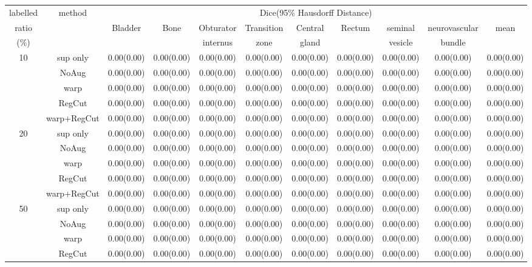 \begin{table}%
\begin{tabular}{c|c|ccccccccc}%
\hline%
labelled&\multirow{3}{*}{method}&\multicolumn{9}{c}{Dice(95\% Hausdorff Distance)}\\%
ratio&&\multirow{2}{*}{Bladder}&\multirow{2}{*}{Bone}&Obturator&Transition&Central&\multirow{2}{*}{Rectum}&seminal&neurovascular&\multirow{2}{*}{mean}\\%
(\%)&&&&internus&zone&gland&&vesicle&bundle&\\%
\hline%
\multirow{5}{*}{10}&sup only&0.00(0.00)&0.00(0.00)&0.00(0.00)&0.00(0.00)&0.00(0.00)&0.00(0.00)&0.00(0.00)&0.00(0.00)&0.00(0.00)\\%
&NoAug&0.00(0.00)&0.00(0.00)&0.00(0.00)&0.00(0.00)&0.00(0.00)&0.00(0.00)&0.00(0.00)&0.00(0.00)&0.00(0.00)\\%
&warp&0.00(0.00)&0.00(0.00)&0.00(0.00)&0.00(0.00)&0.00(0.00)&0.00(0.00)&0.00(0.00)&0.00(0.00)&0.00(0.00)\\%
&RegCut&0.00(0.00)&0.00(0.00)&0.00(0.00)&0.00(0.00)&0.00(0.00)&0.00(0.00)&0.00(0.00)&0.00(0.00)&0.00(0.00)\\%
&warp+RegCut&0.00(0.00)&0.00(0.00)&0.00(0.00)&0.00(0.00)&0.00(0.00)&0.00(0.00)&0.00(0.00)&0.00(0.00)&0.00(0.00)\\%
\hline%
\multirow{5}{*}{20}&sup only&0.00(0.00)&0.00(0.00)&0.00(0.00)&0.00(0.00)&0.00(0.00)&0.00(0.00)&0.00(0.00)&0.00(0.00)&0.00(0.00)\\%
&NoAug&0.00(0.00)&0.00(0.00)&0.00(0.00)&0.00(0.00)&0.00(0.00)&0.00(0.00)&0.00(0.00)&0.00(0.00)&0.00(0.00)\\%
&warp&0.00(0.00)&0.00(0.00)&0.00(0.00)&0.00(0.00)&0.00(0.00)&0.00(0.00)&0.00(0.00)&0.00(0.00)&0.00(0.00)\\%
&RegCut&0.00(0.00)&0.00(0.00)&0.00(0.00)&0.00(0.00)&0.00(0.00)&0.00(0.00)&0.00(0.00)&0.00(0.00)&0.00(0.00)\\%
&warp+RegCut&0.00(0.00)&0.00(0.00)&0.00(0.00)&0.00(0.00)&0.00(0.00)&0.00(0.00)&0.00(0.00)&0.00(0.00)&0.00(0.00)\\%
\hline%
\multirow{5}{*}{50}&sup only&0.00(0.00)&0.00(0.00)&0.00(0.00)&0.00(0.00)&0.00(0.00)&0.00(0.00)&0.00(0.00)&0.00(0.00)&0.00(0.00)\\%
&NoAug&0.00(0.00)&0.00(0.00)&0.00(0.00)&0.00(0.00)&0.00(0.00)&0.00(0.00)&0.00(0.00)&0.00(0.00)&0.00(0.00)\\%
&warp&0.00(0.00)&0.00(0.00)&0.00(0.00)&0.00(0.00)&0.00(0.00)&0.00(0.00)&0.00(0.00)&0.00(0.00)&0.00(0.00)\\%
&RegCut&0.00(0.00)&0.00(0.00)&0.00(0.00)&0.00(0.00)&0.00(0.00)&0.00(0.00)&0.00(0.00)&0.00(0.00)&0.00(0.00)\\%

\end{tabular}
\end{table}
